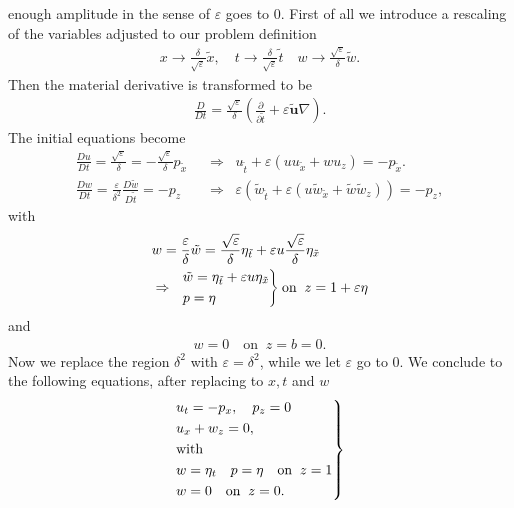 enough amplitude in the sense of $\varepsilon$ goes to $0$. First of all we
introduce a rescaling of the variables adjusted to our problem definition
\begin{align}\label{eq:epsdelta}
    x \rightarrow \frac{\delta}{\sqrt{\varepsilon} }\tilde{x}, \quad t
    \rightarrow \frac{\delta}{\sqrt{\varepsilon} }\tilde{t}\quad
    w \rightarrow \frac{\sqrt{\varepsilon} }{\delta}\tilde{w}.
\end{align}
Then the material derivative is transformed to be
\begin{align}
    \frac{D}{Dt} = \frac{\sqrt{\varepsilon}}{\delta}(\frac{\partial
    }{\partial \tilde{t}} +\varepsilon \tilde{\mathbf{u}} \nabla).
\end{align}
The initial equations become
\begin{align}
    \frac{Du}{Dt} = \frac{\sqrt{\varepsilon}}{\delta} =-
    \frac{\sqrt{\varepsilon} }{\delta} p_{\tilde{x}}\;\; &\Rightarrow\;\;
    u_{\tilde{t}} + \varepsilon(u u_{\tilde{x}} + wu_z)= -p_{\tilde{x}}.\\
    \frac{Dw}{Dt} = \frac{\varepsilon}{\delta^2}
    \frac{D\tilde{w}}{D\tilde{t}}=-p_z \;\;&\Rightarrow\;\;
    \varepsilon\left(\tilde{w}_{\tilde{t}} + \varepsilon\left(
    u\tilde{w}_{\tilde{x}}+ \tilde{w}\tilde{w}_z \right)   \right)  = -p_z,
\end{align}
with
\begin{align}
    &w
    = \frac{\varepsilon}{\delta}\tilde{w}
    = \frac{\sqrt{\varepsilon} }{\delta}
    \eta_{\tilde{t}}+\varepsilon u\frac{\sqrt{\varepsilon}}{\delta}
    \eta_{\tilde{x}}\\
    &\Rightarrow\;\;
    \begin{drcases}
    \tilde{w} = \eta_{\tilde{t}}+ \varepsilon u
    \eta_{\tilde{x}}\\
    p=\eta
    \end{drcases}
    \text{on}\;\; z = 1+\varepsilon\eta
\end{align}
and
\begin{align}
    w = 0 \quad \text{on}\;\; z= b = 0.
\end{align}
Now we replace the region $\delta^2$ with $\varepsilon = \delta^2$, while we
let $\varepsilon$ go to $0$. We conclude to the following equations, after
replacing to $x, t$ and $w$
\begin{align}\label{eq:kdv3}
    \begin{drcases}
    u_t = -p_x, \quad p_z = 0\\
    u_x + w_z = 0,\\
    \text{with}\\
    w=\eta_t \quad p=\eta \quad \text{on}\;\; z= 1\\
    w = 0 \quad \text{on}\;\; z= 0.
    \end{drcases}
\end{align}
